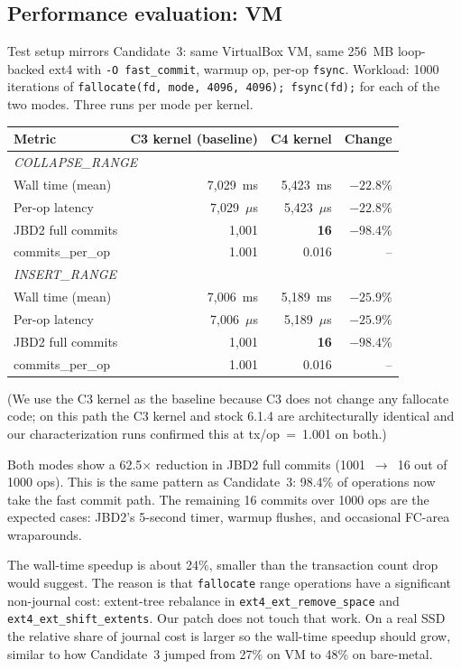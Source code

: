 \documentclass[11pt,a4paper]{article}
\begin{document}
\subsection{Performance evaluation: VM}

Test setup mirrors Candidate~3: same VirtualBox VM, same 256~MB
loop-backed ext4 with \texttt{-O fast\_commit}, warmup op, per-op
\texttt{fsync}. Workload: 1000 iterations of
\texttt{fallocate(fd, mode, 4096, 4096); fsync(fd);} for each of the
two modes. Three runs per mode per kernel.

\begin{center}
\begin{tabular}{lrrr}
\toprule
Metric & C3 kernel (baseline) & C4 kernel & Change \\
\midrule
\multicolumn{4}{l}{\textit{COLLAPSE\_RANGE}} \\
Wall time (mean)     & 7{,}029~ms & 5{,}423~ms & $-22.8\%$ \\
Per-op latency       & 7{,}029~$\mu$s & 5{,}423~$\mu$s & $-22.8\%$ \\
JBD2 full commits    & 1{,}001 & \textbf{16} & $\mathbf{-98.4\%}$ \\
commits\_per\_op     & 1.001 & 0.016 & -- \\
\midrule
\multicolumn{4}{l}{\textit{INSERT\_RANGE}} \\
Wall time (mean)     & 7{,}006~ms & 5{,}189~ms & $-25.9\%$ \\
Per-op latency       & 7{,}006~$\mu$s & 5{,}189~$\mu$s & $-25.9\%$ \\
JBD2 full commits    & 1{,}001 & \textbf{16} & $\mathbf{-98.4\%}$ \\
commits\_per\_op     & 1.001 & 0.016 & -- \\
\bottomrule
\end{tabular}
\end{center}

(We use the C3 kernel as the baseline because C3 does not change
any fallocate code; on this path the C3 kernel and stock 6.1.4 are
architecturally identical and our characterization runs confirmed
this at tx/op~=~1.001 on both.)

Both modes show a 62.5$\times$ reduction in JBD2 full commits
(1001~$\to$~16 out of 1000 ops). This is the same pattern as
Candidate~3: 98.4\% of operations now take the fast commit path.
The remaining 16 commits over 1000 ops are the expected cases:
JBD2's 5-second timer, warmup flushes, and occasional FC-area
wraparounds.

The wall-time speedup is about 24\%, smaller than the transaction
count drop would suggest. The reason is that \texttt{fallocate}
range operations have a significant non-journal cost: extent-tree
rebalance in \texttt{ext4\_ext\_remove\_space} and
\texttt{ext4\_ext\_shift\_extents}. Our patch does not touch that
work. On a real SSD the relative share of journal cost is larger so
the wall-time speedup should grow, similar to how Candidate~3
jumped from 27\% on VM to 48\% on bare-metal.
\end{document}
